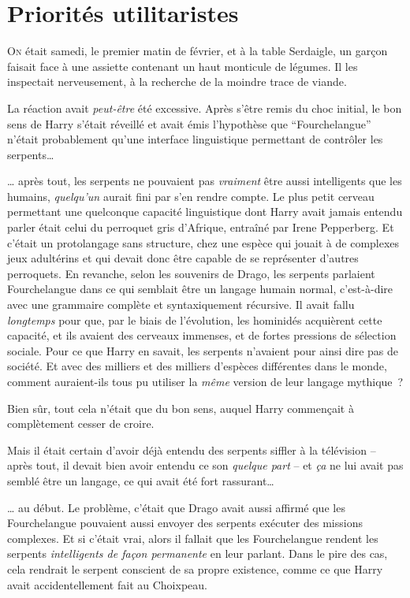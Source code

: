 \chapter{Priorités utilitaristes}

\lettrine{O}{n} était samedi, le premier matin de février, et à la table Serdaigle, un garçon faisait face à une assiette contenant un haut monticule de légumes.
Il les inspectait nerveusement, à la recherche de la moindre trace de viande.

La réaction avait \emph{peut-être} été excessive.
Après s'être remis du choc initial, le bon sens de Harry s'était réveillé et avait émis l'hypothèse que “Fourchelangue” n'était probablement qu'une interface linguistique permettant de contrôler les serpents…

… après tout, les serpents ne pouvaient pas \emph{vraiment} être aussi intelligents que les humains, \emph{quelqu'un} aurait fini par s'en rendre compte.
Le plus petit cerveau permettant une quelconque capacité linguistique dont Harry avait jamais entendu parler était celui du perroquet gris d'Afrique, entraîné par Irene Pepperberg.
Et c'était un protolangage sans structure, chez une espèce qui jouait à de complexes jeux adultérins et qui devait donc être capable de se représenter d'autres perroquets.
En revanche, selon les souvenirs de Drago, les serpents parlaient Fourchelangue dans ce qui semblait être un langage humain normal, c'est-à-dire avec une grammaire complète et syntaxiquement récursive.
Il avait fallu \emph{longtemps} pour que, par le biais de l'évolution, les hominidés acquièrent cette capacité, et ils avaient des cerveaux immenses, et de fortes pressions de sélection sociale.
Pour ce que Harry en savait, les serpents n'avaient pour ainsi dire pas de société.
Et avec des milliers et des milliers d'espèces différentes dans le monde, comment auraient-ils tous pu utiliser la \emph{même} version de leur langage mythique~?

Bien sûr, tout cela n'était que du bon sens, auquel Harry commençait à complètement cesser de croire.

Mais il était certain d'avoir déjà entendu des serpents siffler à la télévision -- après tout, il devait bien avoir entendu ce son \emph{quelque part} -- et \emph{ça} ne lui avait pas semblé être un langage, ce qui avait été fort rassurant…

… au début.
Le problème, c'était que Drago avait aussi affirmé que les Fourchelangue pouvaient aussi envoyer des serpents exécuter des missions complexes.
Et si c'était vrai, alors il fallait que les Fourchelangue rendent les serpents \emph{intelligents de façon permanente} en leur parlant.
Dans le pire des cas, cela rendrait le serpent conscient de sa propre existence, comme ce que Harry avait accidentellement fait au Choixpeau.

